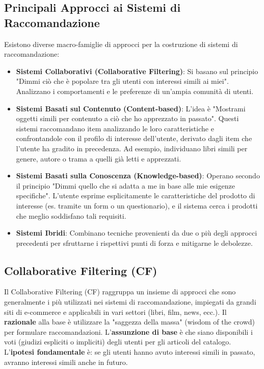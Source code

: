 \documentclass{article}
\begin{document}
\subsection{Principali Approcci ai Sistemi di Raccomandazione}
Esistono diverse macro-famiglie di approcci per la costruzione di sistemi di raccomandazione:
\begin{itemize}
    \item \textbf{Sistemi Collaborativi (Collaborative Filtering)}: Si basano sul principio "Dimmi ciò che è popolare tra gli utenti con interessi simili ai miei". Analizzano i comportamenti e le preferenze di un'ampia comunità di utenti.
    \item \textbf{Sistemi Basati sul Contenuto (Content-based)}: L'idea è "Mostrami oggetti simili per contenuto a ciò che ho apprezzato in passato". Questi sistemi raccomandano item analizzando le loro caratteristiche e confrontandole con il profilo di interesse dell'utente, derivato dagli item che l'utente ha gradito in precedenza. Ad esempio, individuano libri simili per genere, autore o trama a quelli già letti e apprezzati.
    \item \textbf{Sistemi Basati sulla Conoscenza (Knowledge-based)}: Operano secondo il principio "Dimmi quello che si adatta a me in base alle mie esigenze specifiche". L'utente esprime esplicitamente le caratteristiche del prodotto di interesse (es. tramite un form o un questionario), e il sistema cerca i prodotti che meglio soddisfano tali requisiti.
    \item \textbf{Sistemi Ibridi}: Combinano tecniche provenienti da due o più degli approcci precedenti per sfruttarne i rispettivi punti di forza e mitigarne le debolezze.
\end{itemize}

\subsection{Collaborative Filtering (CF)}
Il Collaborative Filtering (CF) raggruppa un insieme di approcci che sono generalmente i più utilizzati nei sistemi di raccomandazione, impiegati da grandi siti di e-commerce e applicabili in vari settori (libri, film, news, ecc.).
Il \textbf{razionale} alla base è utilizzare la "saggezza della massa" (wisdom of the crowd) per formulare raccomandazioni.
L'\textbf{assunzione di base} è che siano disponibili i voti (giudizi espliciti o impliciti) degli utenti per gli articoli del catalogo.
L'\textbf{ipotesi fondamentale} è: se gli utenti hanno avuto interessi simili in passato, avranno interessi simili anche in futuro.
\end{document}
